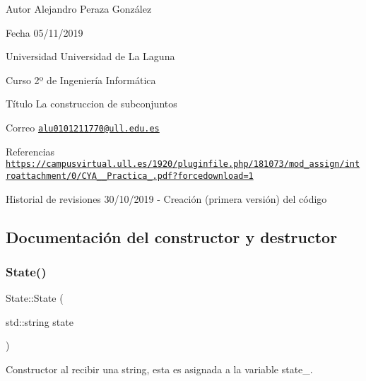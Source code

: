 \begin{DoxyAuthor}{Autor}
Alejandro Peraza González 
\end{DoxyAuthor}
\begin{DoxyDate}{Fecha}
05/11/2019 
\end{DoxyDate}
\begin{DoxyParagraph}{Universidad}
Universidad de La Laguna 
\end{DoxyParagraph}
\begin{DoxyParagraph}{Curso}
2º de Ingeniería Informática 
\end{DoxyParagraph}
\begin{DoxyParagraph}{Título}
La construccion de subconjuntos 
\end{DoxyParagraph}
\begin{DoxyParagraph}{Correo }
\href{mailto:alu0101211770@ull.edu.es}{\tt alu0101211770@ull.\+edu.\+es} 
\end{DoxyParagraph}
\begin{DoxyParagraph}{Referencias}
\href{https://campusvirtual.ull.es/1920/pluginfile.php/181073/mod_assign/introattachment/0/CYA_1920_Practica_7.pdf?forcedownload=1}{\tt https\+://campusvirtual.\+ull.\+es/1920/pluginfile.\+php/181073/mod\+\_\+assign/introattachment/0/\+C\+Y\+A\+\_\+\_\+\+Practica\+\_.\+pdf?forcedownload=1} 
\end{DoxyParagraph}
\begin{DoxyParagraph}{Historial de revisiones}
30/10/2019 -\/ Creación (primera versión) del código 
\end{DoxyParagraph}


\subsection{Documentación del constructor y destructor}
\mbox{\label{classState_aeb74cd119de80264e758b143d65b19f5}} 
\subsubsection{\texorpdfstring{State()}{State()}}
{\footnotesize\ttfamily State\+::\+State (\begin{DoxyParamCaption}\item[{std\+::string}]{state }\end{DoxyParamCaption})}



Constructor al recibir una string, esta es asignada a la variable state\+\_\+. 



